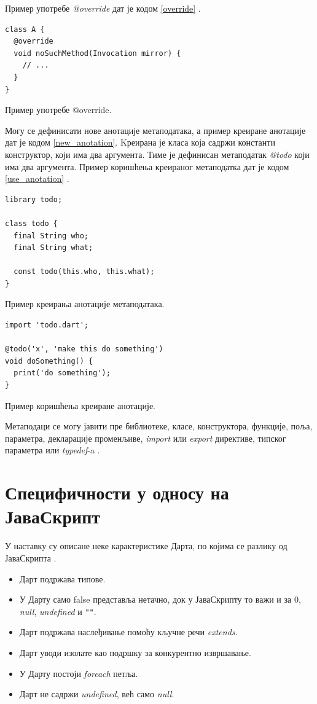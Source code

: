 \documentclass[12pt,oneside]{memoir}
\begin{document}
Пример употребе \textit{@override} дат је кодом \ref{override} \cite{dart, dart1}. 

\begin{listing}
\begin{verbatim}
class A {
  @override
  void noSuchMethod(Invocation mirror) {
    // ...
  }
}
\end{verbatim}
\caption{Пример употребе @override.}
\label{override}
\end{listing}

Могу се дефинисати нове анотације метаподатака, а пример креиране анотације дат је кодом \ref{new_anotation}. Kреирана је класа која садржи константи конструктор, који има два аргумента. Тиме је дефинисан метаподатак \textit{@todo} који има два аргумента. Пример коришћења креираног метаподатка дат је кодом \ref{use_anotation} \cite{dart, dart1}.

\begin{listing}
\begin{verbatim}
library todo;

class todo {
  final String who;
  final String what;

  const todo(this.who, this.what);
}
\end{verbatim}
\caption{Пример креирања анотације метаподатака.}
\label{new_anotation}
\end{listing}

\begin{listing}
\begin{verbatim}
import 'todo.dart';

@todo('x', 'make this do something')
void doSomething() {
  print('do something');
}
\end{verbatim}
\caption{Пример коришћења креиране анотације.}
\label{use_anotation}
\end{listing}
Метаподаци се могу јавити пре библиотеке, класе, конструктора, функције, поља, параметра, декларације променљиве, \textit{import} или \textit{export} директиве, типског параметра или \textit{typedef}-a \cite{dart, dart1}.
\section{Специфичности у односу на ЈаваСкрипт}
\label{specificnosti}
У наставку су описане неке карактеристике Дарта, по којима се разлику од ЈаваСкрипта \cite{dart, dart1}.
\begin{itemize}
\item Дарт подржава типове.
\item У Дарту само false представља нетачно, док у ЈаваСкрипту то важи и за 0, \textit{null}, \textit{undefined} и \verb|""|.
\item Дарт подржава наслеђивање помоћу кључне речи \textit{extends}.
\item Дарт уводи изолате као подршку за конкурентно извршавање.
\item У Дарту постоји \textit{foreach} петља.
\item Дарт не садржи \textit{undefined}, већ само \textit{null}.
\end{itemize}
\end{document}
